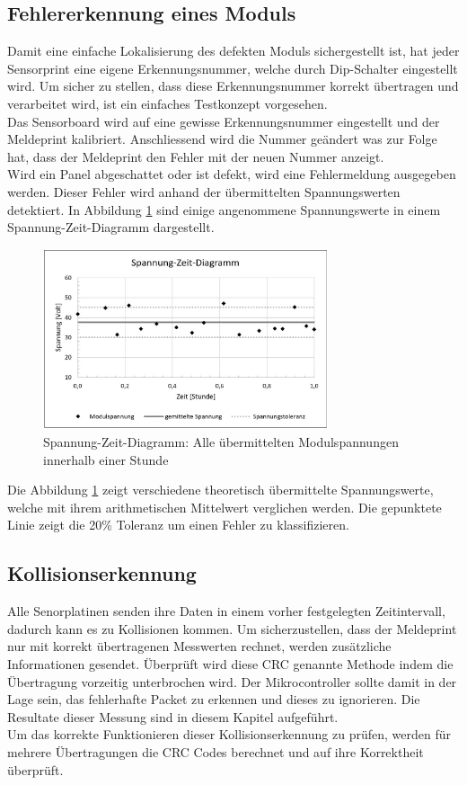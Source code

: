 \subsection{Fehlererkennung eines Moduls}
Damit eine einfache Lokalisierung des defekten Moduls sichergestellt ist, hat jeder Sensorprint eine eigene Erkennungsnummer, welche durch Dip-Schalter eingestellt wird. Um sicher zu stellen, dass diese Erkennungsnummer korrekt übertragen und verarbeitet wird, ist ein einfaches Testkonzept vorgesehen. \\
Das Sensorboard wird auf eine gewisse Erkennungsnummer eingestellt und der Meldeprint kalibriert. Anschliessend wird die Nummer geändert was zur Folge hat, dass der Meldeprint den Fehler mit der neuen Nummer anzeigt.\\

Wird ein Panel abgeschattet oder ist defekt, wird eine Fehlermeldung ausgegeben werden. Dieser Fehler wird anhand der übermittelten Spannungswerten detektiert. In Abbildung \ref{fig:failurecalc-diagram} sind einige angenommene Spannungswerte in einem Spannung-Zeit-Diagramm dargestellt. 

\begin{figure}[htbp] 
  \centering
     \includegraphics[width=0.75\textwidth]{graphics/failurecalc-diagram}
  \caption{Spannung-Zeit-Diagramm: Alle übermittelten Modulspannungen innerhalb einer Stunde}
  \label{fig:failurecalc-diagram}
\end{figure}
Die Abbildung \ref{fig:failurecalc-diagram} zeigt verschiedene theoretisch übermittelte Spannungswerte, welche mit ihrem arithmetischen Mittelwert verglichen werden. Die gepunktete Linie zeigt die 20\% Toleranz um einen Fehler zu klassifizieren.
\subsection{Kollisionserkennung}
Alle Senorplatinen senden ihre Daten in einem vorher festgelegten Zeitintervall, dadurch kann es zu Kollisionen kommen. Um sicherzustellen, dass der Meldeprint nur mit korrekt übertragenen Messwerten rechnet, werden zusätzliche Informationen gesendet. Überprüft wird diese CRC genannte Methode indem die Übertragung vorzeitig unterbrochen wird. Der Mikrocontroller sollte damit in der Lage sein, das fehlerhafte Packet zu erkennen und dieses zu ignorieren. Die Resultate dieser Messung sind in diesem Kapitel aufgeführt.\\

Um das korrekte Funktionieren dieser Kollisionserkennung zu prüfen, werden für mehrere Übertragungen die CRC Codes berechnet und auf ihre Korrektheit überprüft.